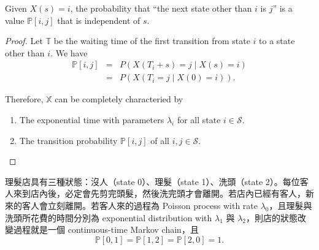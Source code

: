 \begin{observation}
Given $ X(s) = i $, the probability that ``the next state other than $ i $ is $ j $'' is a value $ \mathbb{P}[i, j] $ that is independent of $ s $.
\begin{proof}
Let $ \mathbb{T} $ be the waiting time of the first transition from state $ i $ to a state other than $ i $. We have
\begin{eqnarray*}
\mathbb{P}[i, j]
  & = & P(X(T_{i} + s) = j \mid X(s) = i) \\
  & = & P(X(T_{i} = j \mid X(0) = i)).
\end{eqnarray*}

Therefore, $ \mathbb{X} $ can be completely characteried by
\begin{enumerate}
  \item The exponential time with parameters $ \lambda_{i} $ for all state $ i \in \mathcal{S} $.
  \item The transition probability $ \mathbb{P}[i, j] $ of all $ i, j \in \mathcal{S} $.
\end{enumerate}
\end{proof}
\end{observation}

\begin{example} \label{ex:barber_shop}
理髮店具有三種狀態：沒人（state 0）、理髮（state 1）、洗頭（state 2）。每位客人來到店內後，必定會先剪完頭髮，然後洗完頭才會離開。若店內已經有客人，新來的客人會立刻離開。若客人來的過程為 Poisson process with rate $ \lambda_{0} $，且理髮與洗頭所花費的時間分別為 exponential distribution with $ \lambda_{1} $ 與 $ \lambda_{2} $，則店的狀態改變過程就是一個 continuous-time Markov chain，且
\[ \mathbb{P}[0, 1] = \mathbb{P}[1, 2] = \mathbb{P}[2, 0] = 1. \]
\end{example}
